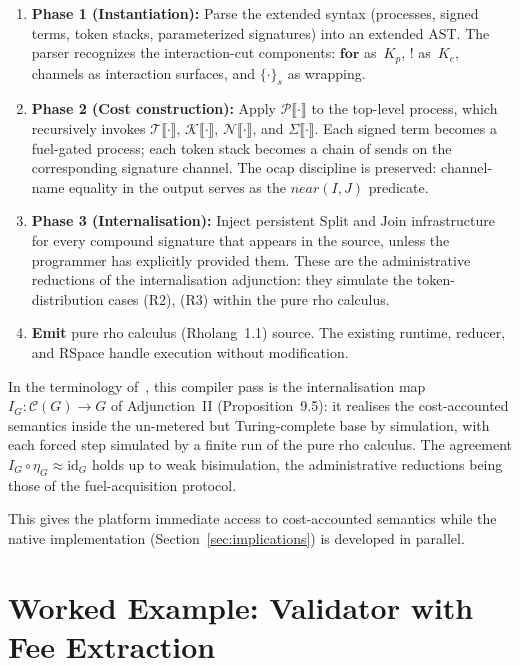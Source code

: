 \documentclass[11pt,a4paper]{article}
\newcommand{\lsem}{\llbracket}
\newcommand{\rsem}{\rrbracket}
\newcommand{\forc}{\mathbf{for}}
\newcommand{\signed}[2]{\{#1\}_{#2}}
\begin{document}
\begin{enumerate}[nosep]
  \item \textbf{Phase 1 (Instantiation):}  Parse the extended
    syntax (processes, signed terms, token stacks, parameterized
    signatures) into an extended AST.  The parser recognizes the
    interaction-cut components: $\forc$ as~$K_p$, $!$ as~$K_e$,
    channels as interaction surfaces, and $\signed{\cdot}{s}$ as
    wrapping.
  \item \textbf{Phase 2 (Cost construction):}  Apply
    $\mathcal{P}\lsem\cdot\rsem$ to the top-level process,
    which recursively invokes
    $\mathcal{T}\lsem\cdot\rsem$,
    $\mathcal{K}\lsem\cdot\rsem$,
    $\mathcal{N}\lsem\cdot\rsem$, and
    $\Sigma\lsem\cdot\rsem$.  Each signed term becomes a
    fuel-gated process; each token stack becomes a chain of
    sends on the corresponding signature channel.  The
    ocap discipline is preserved: channel-name equality in
    the output serves as the $\mathit{near}(I, J)$ predicate.
  \item \textbf{Phase 3 (Internalisation):}  Inject persistent
    $\mathrm{Split}$ and $\mathrm{Join}$ infrastructure for
    every compound signature that appears in the source,
    unless the programmer has explicitly provided them.
    These are the administrative reductions of the
    internalisation adjunction: they simulate the
    token-distribution cases (R2), (R3) within the pure rho
    calculus.
  \item \textbf{Emit} pure rho calculus (Rholang~1.1) source.
    The existing runtime, reducer, and RSpace handle
    execution without modification.
\end{enumerate}

\noindent
In the terminology of~\cite{CostEndofunctor}, this compiler
pass is the internalisation map
$I_G : \mathcal{C}(G) \to G$ of Adjunction~II
(Proposition~9.5): it realises the cost-accounted semantics
inside the un-metered but Turing-complete base by simulation,
with each forced step simulated by a finite run of the pure
rho calculus.  The agreement $I_G \circ \eta_G \approx
\mathrm{id}_G$ holds up to weak bisimulation, the
administrative reductions being those of the fuel-acquisition
protocol.

This gives the platform immediate access to cost-accounted
semantics while the native implementation
(Section~\ref{sec:implications}) is developed in parallel.

\section{Worked Example: Validator with Fee Extraction}
\label{app:example}
\end{document}
